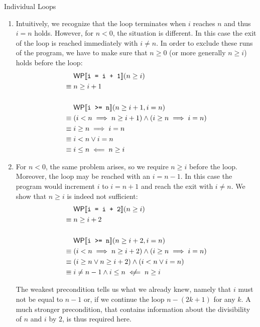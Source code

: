 \documentclass[
  english
]{tumteaching}
\begin{document}
\begin{assignment}[L]{Individual Loops}
\begin{solution}
\begin{enumerate}
			\item Intuitively, we recognize that the loop terminates when $i$ reaches $n$ and thus $i = n$ holds. However, for $n < 0$, the situation is different. In this case the exit of the loop is reached immediately with $i \neq n$. In order to exclude these runs of the program, we have to make sure that $n \geq 0$ (or more generally $n \geq i$) holds before the loop:
			\begin{align*}
				&\textsf{WP}\llbracket{}\texttt{i = i + 1}\rrbracket{}(n \geq i)\\
				\equiv\;& n \geq i + 1\\
				&\\
				&\textsf{WP}\llbracket{}\texttt{i >= n}\rrbracket{}(n \geq i + 1, i = n)\\
				\equiv\;& (i < n \implies n \geq i + 1) \land (i \geq n \implies i = n)\\
				\equiv\;& i \geq n \implies i = n\\
				\equiv\;& i < n \lor i = n\\
				\equiv\;& i \leq n \impliedby n \geq i\\
			\end{align*}
			
			\item For $n < 0$, the same problem arises, so we require $n \geq i$ before the loop. Moreover, the loop may be reached with an $i = n - 1$. In this case the program would increment $i$ to $i = n + 1$ and reach the exit with $i \neq n$. We show that $n \geq i$ is indeed not sufficient:
			\begin{align*}
				&\WP{i = i + 2}(n \geq i)\\
				\equiv\;&n \geq i + 2\\
				&\\
				&\WP{i >= n}(n \geq i + 2, i = n)\\
				\equiv\;& (i < n \implies n \geq i + 2) \land (i \geq n \implies i = n)\\
				\equiv\;& (i \geq n \lor n \geq i + 2) \land (i < n \lor i = n)\\
				\equiv\;& i \neq n - 1 \land i \leq n \centernot \impliedby n \geq i\\
			\end{align*}
				
			The weakest precondition tells us what we already knew, namely that $i$ must not be equal to $n - 1$ or, if we continue the loop $n - (2k + 1)$ for any $k$. A much stronger precondition, that contains information about the divisibility of $n$ and $i$ by $2$, is thus required here.
		\end{enumerate}
	\end{solution}
\end{assignment}
\end{document}
